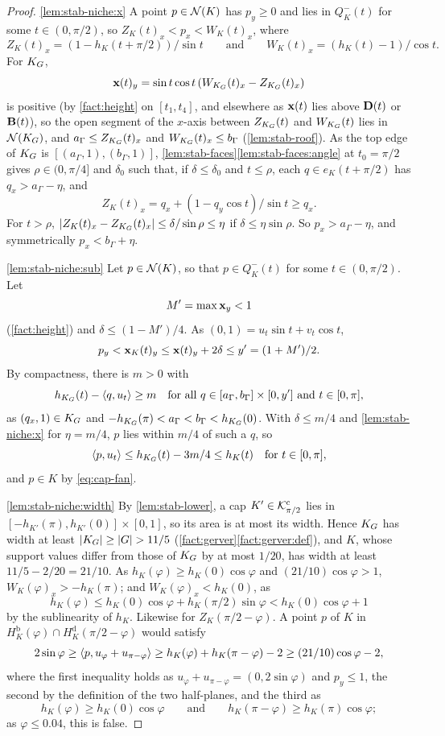 \begin{proof}
\ref{lem:stab-niche:x} A point $p\in\mathcal{N}(K)$ has $p_y\ge0$ and lies in
$Q^-_K(t)$ for some $t\in(0,\pi/2)$, so $Z_K(t)_x<p_x<W_K(t)_x$, where
\[
  Z_K(t)_x=(1-h_K(t+\pi/2))/\sin t\qquad\text{and}\qquad
  W_K(t)_x=(h_K(t)-1)/\cos t.
\]
For $K_G$,
\[
  \mathbf{x}(t)_y=\sin t\cos t\,(W_{K_G}(t)_x-Z_{K_G}(t)_x)
\]
is positive (by \cref{fact:height} on $[t_1,t_4]$, and elsewhere as $\mathbf{x}(t)$
lies above $\mathbf{D}(t)$ or $\mathbf{B}(t)$), so the open segment of the $x$-axis between
$Z_{K_G}(t)$ and $W_{K_G}(t)$ lies in $\mathcal{N}(K_G)$, and
$a_\Gamma\le Z_{K_G}(t)_x$ and $W_{K_G}(t)_x\le b_\Gamma$
(\cref{lem:stab-roof}). As the top edge of $K_G$ is
$[(a_\Gamma,1),(b_\Gamma,1)]$, \cref{lem:stab-faces}\ref{lem:stab-faces:angle}
at $t_0=\pi/2$ gives $\rho\in(0,\pi/4]$ and $\delta_0$ such that, if
$\delta\le\delta_0$ and $t\le\rho$, each $q\in e_K(t+\pi/2)$ has
$q_x>a_\Gamma-\eta$, and
\[
  Z_K(t)_x=q_x+(1-q_y\cos t)/\sin t\ge q_x.
\]
For $t>\rho$, $\lvert Z_K(t)_x-Z_{K_G}(t)_x\rvert\le\delta/\sin\rho\le\eta$ if
$\delta\le\eta\sin\rho$. So $p_x>a_\Gamma-\eta$, and symmetrically
$p_x<b_\Gamma+\eta$.

\ref{lem:stab-niche:sub} Let $p\in\mathcal{N}(K)$, so that $p\in Q^-_K(t)$ for some
$t\in(0,\pi/2)$. Let
\[
  M'=\max\mathbf{x}_y<1
\]
(\cref{fact:height}) and $\delta\le(1-M')/4$. As $(0,1)=u_t\sin t+v_t\cos t$,
\[
  p_y<\mathbf{x}_K(t)_y\le\mathbf{x}(t)_y+2\delta\le y'=(1+M')/2.
\]
By compactness, there is $m>0$ with
\[
  h_{K_G}(t)-\langle q,u_t\rangle\ge m\quad
  \text{for all $q\in[a_\Gamma,b_\Gamma]\times[0,y']$ and $t\in[0,\pi]$},
\]
as $(q_x,1)\in K_G$ and $-h_{K_G}(\pi)<a_\Gamma<b_\Gamma<h_{K_G}(0)$. With
$\delta\le m/4$ and \ref{lem:stab-niche:x} for $\eta=m/4$, $p$ lies within $m/4$
of such a $q$, so
\[
  \langle p,u_t\rangle\le h_{K_G}(t)-3m/4\le h_K(t)\quad\text{for }t\in[0,\pi],
\]
and $p\in K$ by \eqref{eq:cap-fan}.

\ref{lem:stab-niche:width} By \cref{lem:stab-lower}, a cap
$K'\in\mathcal{K}^{\mathrm{c}}_{\pi/2}$ lies in $[-h_{K'}(\pi),h_{K'}(0)]\times[0,1]$, so its area
is at most its width. Hence $K_G$ has width at least $\lvert K_G\rvert\ge\lvert G\rvert>11/5$
(\cref{fact:gerver}\ref{fact:gerver:def}), and $K$, whose support values
differ from those of $K_G$ by at most $1/20$, has width at least
$11/5-2/20=21/10$. As $h_K(\varphi)\ge h_K(0)\cos\varphi$ and
$(21/10)\cos\varphi>1$, $W_K(\varphi)_x>-h_K(\pi)$; and
$W_K(\varphi)_x<h_K(0)$, as
\[
  h_K(\varphi)\le h_K(0)\cos\varphi+h_K(\pi/2)\sin\varphi<h_K(0)\cos\varphi+1
\]
by the sublinearity of $h_K$. Likewise for $Z_K(\pi/2-\varphi)$. A point $p$
of $K$ in $H^{\mathrm b}_K(\varphi)\cap H^{\mathrm d}_K(\pi/2-\varphi)$ would
satisfy
\[
  2\sin\varphi\ge\langle p,u_\varphi+u_{\pi-\varphi}\rangle
  \ge h_K(\varphi)+h_K(\pi-\varphi)-2\ge(21/10)\cos\varphi-2,
\]
where the first inequality holds as $u_\varphi+u_{\pi-\varphi}=(0,2\sin\varphi)$
and $p_y\le1$, the second by the definition of the two half-planes, and the
third as
\[
  h_K(\varphi)\ge h_K(0)\cos\varphi\qquad\text{and}\qquad
  h_K(\pi-\varphi)\ge h_K(\pi)\cos\varphi;
\]
as $\varphi\le0.04$, this is false.
\end{proof}

